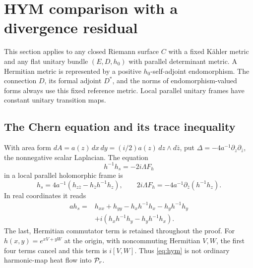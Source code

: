 \section{HYM comparison with a divergence residual}\label{sec:comparison}

This section applies to any closed Riemann surface $C$ with a fixed
K\"ahler metric and any flat unitary bundle $(E,D,h_0)$ with parallel
determinant metric. A Hermitian metric is represented by a positive
$h_0$-self-adjoint endomorphism. The connection $D$, its formal adjoint
$D^*$, and the norms of endomorphism-valued forms always use this fixed
reference metric. Local parallel unitary frames have constant unitary
transition maps.

\subsection{The Chern equation and its trace inequality}
With area form $dA=a(z)\,dx\,dy=(i/2)a(z)\,dz\wedge d\bar z$, put
$\Delta=-4a^{-1}\partial_z\partial_{\bar z}$, the nonnegative
scalar Laplacian. The equation
\begin{equation}\label{eq:hym}
 h^{-1}h_s=-2i\Lambda F_h
\end{equation}
in a local parallel holomorphic frame is
\begin{equation}\label{eq:local-hym}
 h_s=4a^{-1}(h_{z\bar z}-h_{\bar z}h^{-1}h_z),
 \qquad
 2i\Lambda F_h=-4a^{-1}\partial_{\bar z}(h^{-1}h_z).
\end{equation}
In real coordinates it reads
\begin{equation}\label{eq:real-hym}
 \begin{split}
 ah_s={}&h_{xx}+h_{yy}-h_xh^{-1}h_x-h_yh^{-1}h_y\\
        &+i(h_xh^{-1}h_y-h_yh^{-1}h_x).
 \end{split}
\end{equation}
The last, Hermitian commutator term is retained throughout the proof.
For $h(x,y)=e^{xV+yW}$ at the origin, with noncommuting Hermitian
$V,W$, the first four terms cancel and this term is $i[V,W]$.
Thus \eqref{eq:hym} is not ordinary harmonic-map heat flow into
$\mathcal P_r$.

